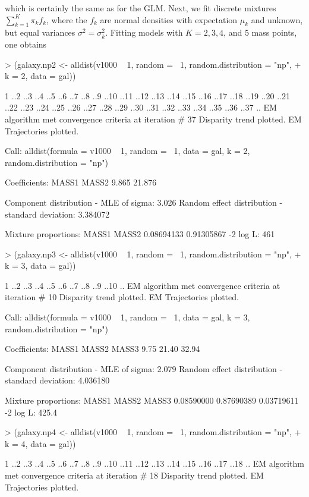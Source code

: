 \documentclass[a4paper]{article}
\begin{document}
\begin{landscape}
\noindent which is certainly the same as for the GLM. Next, we fit discrete mixtures $\sum_{k=1}^K\pi_kf_k$, where the $f_k$ are normal densities with expectation 
$\mu_k$ and unknown, but equal variances $\sigma^2=\sigma^2_k$.
Fitting models with $K=2, 3, 4$, and 5 mass points, one obtains
\begin{Schunk}
\begin{Sinput}
> (galaxy.np2 <- alldist(v1000 ~ 1, random = ~1, random.distribution = "np", 
+     k = 2, data = gal))
\end{Sinput}
\begin{Soutput}
1 ..2 ..3 ..4 ..5 ..6 ..7 ..8 ..9 ..10 ..11 ..12 ..13 ..14 ..15 ..16 ..17 ..18 ..19 ..20 ..21 ..22 ..23 ..24 ..25 ..26 ..27 ..28 ..29 ..30 ..31 ..32 ..33 ..34 ..35 ..36 ..37 ..
EM algorithm met convergence criteria at iteration #  37 
Disparity trend plotted.
EM Trajectories plotted.

Call:  alldist(formula = v1000 ~ 1, random = ~1, data = gal, k = 2,      random.distribution = "np") 

Coefficients:
 MASS1   MASS2  
 9.865  21.876  

Component distribution - MLE of sigma:	   3.026 
Random effect distribution - standard deviation:	   3.384072 

Mixture proportions:
     MASS1       MASS2  
0.08694133  0.91305867  
-2 log L:	    461 
\end{Soutput}
\begin{Sinput}
> (galaxy.np3 <- alldist(v1000 ~ 1, random = ~1, random.distribution = "np", 
+     k = 3, data = gal))
\end{Sinput}
\begin{Soutput}
1 ..2 ..3 ..4 ..5 ..6 ..7 ..8 ..9 ..10 ..
EM algorithm met convergence criteria at iteration #  10 
Disparity trend plotted.
EM Trajectories plotted.

Call:  alldist(formula = v1000 ~ 1, random = ~1, data = gal, k = 3,      random.distribution = "np") 

Coefficients:
MASS1  MASS2  MASS3  
 9.75  21.40  32.94  

Component distribution - MLE of sigma:	   2.079 
Random effect distribution - standard deviation:	   4.036180 

Mixture proportions:
     MASS1       MASS2       MASS3  
0.08590000  0.87690389  0.03719611  
-2 log L:	    425.4 
\end{Soutput}
\begin{Sinput}
> (galaxy.np4 <- alldist(v1000 ~ 1, random = ~1, random.distribution = "np", 
+     k = 4, data = gal))
\end{Sinput}
\begin{Soutput}
1 ..2 ..3 ..4 ..5 ..6 ..7 ..8 ..9 ..10 ..11 ..12 ..13 ..14 ..15 ..16 ..17 ..18 ..
EM algorithm met convergence criteria at iteration #  18 
Disparity trend plotted.
EM Trajectories plotted.


\end{Soutput}
\end{Schunk}
\end{landscape}
\end{document}
